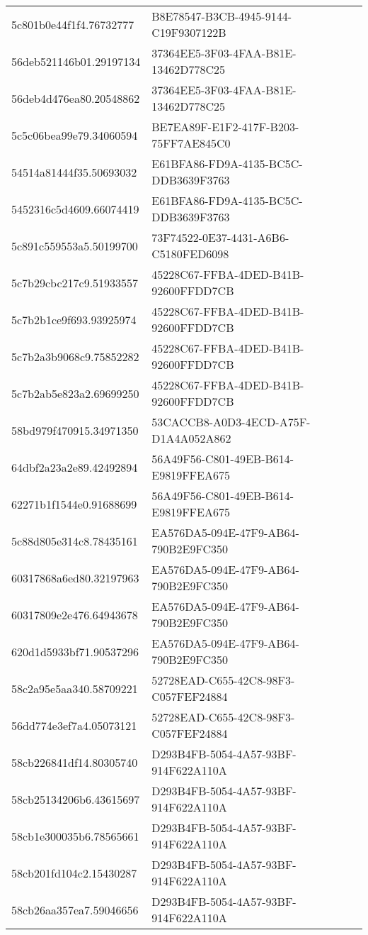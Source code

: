 \begin{tabular}{ll}
5c801b0e44f1f4.76732777 & B8E78547-B3CB-4945-9144-C19F9307122B \\
56deb521146b01.29197134 & 37364EE5-3F03-4FAA-B81E-13462D778C25 \\
56deb4d476ea80.20548862 & 37364EE5-3F03-4FAA-B81E-13462D778C25 \\
5c5c06bea99e79.34060594 & BE7EA89F-E1F2-417F-B203-75FF7AE845C0 \\
54514a81444f35.50693032 & E61BFA86-FD9A-4135-BC5C-DDB3639F3763 \\
5452316c5d4609.66074419 & E61BFA86-FD9A-4135-BC5C-DDB3639F3763 \\
5c891c559553a5.50199700 & 73F74522-0E37-4431-A6B6-C5180FED6098 \\
5c7b29cbc217c9.51933557 & 45228C67-FFBA-4DED-B41B-92600FFDD7CB \\
5c7b2b1ce9f693.93925974 & 45228C67-FFBA-4DED-B41B-92600FFDD7CB \\
5c7b2a3b9068c9.75852282 & 45228C67-FFBA-4DED-B41B-92600FFDD7CB \\
5c7b2ab5e823a2.69699250 & 45228C67-FFBA-4DED-B41B-92600FFDD7CB \\
58bd979f470915.34971350 & 53CACCB8-A0D3-4ECD-A75F-D1A4A052A862 \\
64dbf2a23a2e89.42492894 & 56A49F56-C801-49EB-B614-E9819FFEA675 \\
62271b1f1544e0.91688699 & 56A49F56-C801-49EB-B614-E9819FFEA675 \\
5c88d805e314c8.78435161 & EA576DA5-094E-47F9-AB64-790B2E9FC350 \\
60317868a6ed80.32197963 & EA576DA5-094E-47F9-AB64-790B2E9FC350 \\
60317809e2e476.64943678 & EA576DA5-094E-47F9-AB64-790B2E9FC350 \\
620d1d5933bf71.90537296 & EA576DA5-094E-47F9-AB64-790B2E9FC350 \\
58c2a95e5aa340.58709221 & 52728EAD-C655-42C8-98F3-C057FEF24884 \\
56dd774e3ef7a4.05073121 & 52728EAD-C655-42C8-98F3-C057FEF24884 \\
58cb226841df14.80305740 & D293B4FB-5054-4A57-93BF-914F622A110A \\
58cb25134206b6.43615697 & D293B4FB-5054-4A57-93BF-914F622A110A \\
58cb1e300035b6.78565661 & D293B4FB-5054-4A57-93BF-914F622A110A \\
58cb201fd104c2.15430287 & D293B4FB-5054-4A57-93BF-914F622A110A \\
58cb26aa357ea7.59046656 & D293B4FB-5054-4A57-93BF-914F622A110A \\

\end{tabular}
